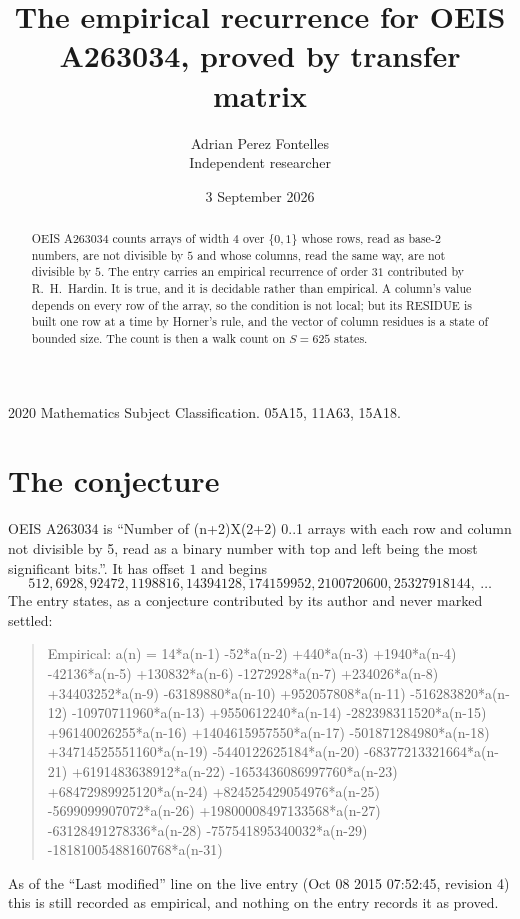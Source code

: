 \documentclass[11pt,a4paper]{article}
\title{The empirical recurrence for OEIS A263034, proved by transfer matrix}
\author{Adrian Perez Fontelles\\ \small Independent researcher}
\date{3 September 2026}
\theoremstyle{plain}
\theoremstyle{definition}
\begin{document}
\maketitle

\begin{abstract}
OEIS A263034 counts arrays of width $4$ over $\{0,1\}$ whose rows, read as base-$2$
numbers, are not divisible by $5$ and whose columns, read the same way, are not divisible by
$5$. The entry carries an empirical recurrence of order $31$ contributed by
R.~H.~Hardin. It is true, and it is decidable rather than empirical. A column's value depends on
every row of the array, so the condition is not local; but its RESIDUE is built one row at a
time by Horner's rule, and the vector of column residues is a state of bounded size. The count
is then a walk count on $S=625$ states.
\end{abstract}

\noindent\small 2020 Mathematics Subject Classification. 05A15, 11A63, 15A18.\normalsize

\section{The conjecture}

OEIS A263034 is ``Number of (n+2)X(2+2) 0..1 arrays with each row and column not divisible by 5, read as a binary number with top and left being the most significant bits.''. It has offset $1$ and begins
\[
512, 6928, 92472, 1198816, 14394128, 174159952, 2100720600, 25327918144,\ \dots
\]
The entry states, as a conjecture contributed by its author and never marked settled:
\begin{quote}
Empirical: a(n) = 14*a(n-1) -52*a(n-2) +440*a(n-3) +1940*a(n-4) -42136*a(n-5) +130832*a(n-6) -1272928*a(n-7) +234026*a(n-8) +34403252*a(n-9) -63189880*a(n-10) +952057808*a(n-11) -516283820*a(n-12) -10970711960*a(n-13) +9550612240*a(n-14) -282398311520*a(n-15) +96140026255*a(n-16) +1404615957550*a(n-17) -501871284980*a(n-18) +34714525551160*a(n-19) -5440122625184*a(n-20) -68377213321664*a(n-21) +6191483638912*a(n-22) -1653436086997760*a(n-23) +68472989925120*a(n-24) +824525429054976*a(n-25) -5699099907072*a(n-26) +19800008497133568*a(n-27) -63128491278336*a(n-28) -757541895340032*a(n-29) -18181005488160768*a(n-31)
\end{quote}
As of the ``Last modified'' line on the live entry (Oct 08 2015 07:52:45, revision 4) this is still
recorded as empirical, and nothing on the entry records it as proved.
\end{document}
